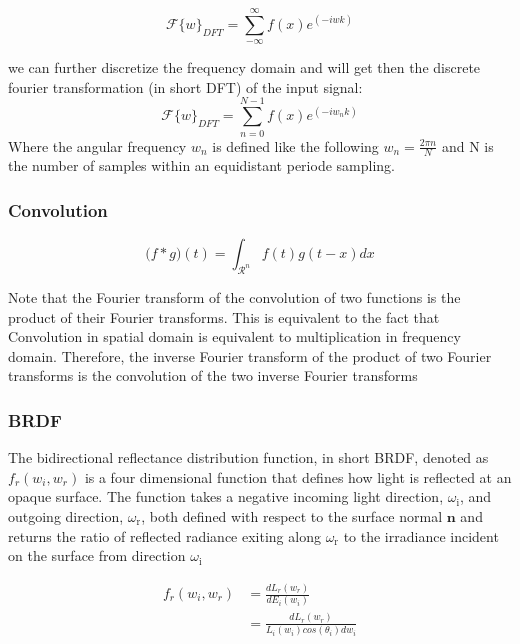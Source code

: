 \begin{equation}
  \mathcal{F}\{w\}_{DFT} = \sum_{-\infty}^{\infty} f(x) e^(-iwk)
\end{equation}

we can further discretize the frequency domain and will get then the discrete fourier transformation (in short DFT) of the input signal:
\begin{equation}
  \mathcal{F}\{w\}_{DFT} = \sum_{n=0}^{N-1} f(x) e^(-iw_{n}k)
\end{equation}
Where the angular frequency $w_n$ is defined like the following $w_n = \frac{2\pi n}{N}$ and N is the number of samples within an equidistant periode sampling.

\subsubsection{Convolution}

\begin{equation}
  \mathcal (f*g)(t) = \int_{\mathcal{R}^n} f(t)g(t-x) dx
\end{equation}

Note that the Fourier transform of the convolution of two functions is the product of their Fourier transforms. This is equivalent to the fact that Convolution in spatial domain is equivalent to multiplication in frequency domain. Therefore, the inverse Fourier transform of the product of two Fourier transforms is the convolution of the two inverse Fourier transforms

\subsubsection{BRDF}
The bidirectional reflectance distribution function, in short BRDF, denoted as $f_r(w_i, w_r)$ is a four dimensional function that defines how light is reflected at an opaque surface. The function takes a negative incoming light direction, $\omega_{\text{i}}$, and outgoing direction, $\omega_{\text{r}}$, both defined with respect to the surface normal $\mathbf{n}$ and returns the ratio of reflected radiance exiting along $\omega_{\text{r}}$ to the irradiance incident on the surface from direction $\omega_{\text{i}}$
  
\begin{align}
  f_r(w_i, w_r)
  & = \frac{dL_r(w_r)}{dE_i(w_i)} \\
  & = \frac{dL_r(w_r)}{L_i(w_i)cos(\theta_i)dw_i}
\end{align}


